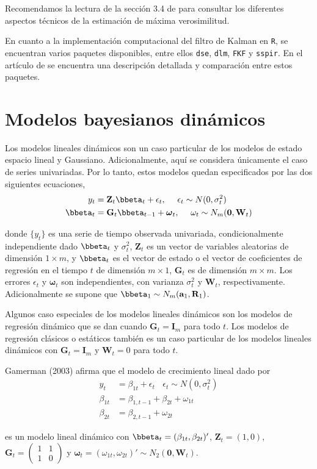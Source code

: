 Recomendamos la lectura de la sección 3.4 de  para consultar los diferentes aspectos técnicos de la estimación de máxima verosimilitud. 

En cuanto a la implementación computacional del filtro de Kalman en \verb'R', se encuentran varios paquetes disponibles, entre ellos \verb'dse', \verb'dlm', \verb'FKF' y \verb'sspir'. En el artículo de  se encuentra una descripción detallada y comparación entre estos paquetes.

\section{Modelos bayesianos dinámicos}

Los modelos lineales dinámicos son un caso particular de los modelos de estado espacio lineal y Gaussiano. Adicionalmente, aquí se considera únicamente el caso de series univariadas. Por lo tanto, estos modelos quedan especificados por las dos siguientes ecuaciones,
\begin{align}
y_t&=\mathbf{Z}_t\bbeta_t+\epsilon_t,\ \ \ \ \epsilon_t\sim N(0,\sigma_t^2)\\
\bbeta_t&=\mathbf{G}_t\bbeta_{t-1}+\boldsymbol{\omega}_t,\ \ \ \ \omega_t\sim N_m(\mathbf{0},\mathbf{W}_t)
\end{align}

donde $\{y_t\}$ es una serie de tiempo observada univariada, condicionalmente independiente dado $\bbeta_t$ y $\sigma^2_t$, $\mathbf{Z}_t$ es un vector de variables aleatorias de dimensión $1\times m$, y $\bbeta_t$ es el vector de estado o el vector de coeficientes de regresión en el tiempo $t$ de dimensión $m\times1$, $\mathbf{G}_t$ es de dimensión $m\times m$. Los errores $\epsilon_t$ y $\boldsymbol{\omega}_t$ son independientes, con varianza $\sigma^2_t$ y $\mathbf{W}_t$, respectivamente. Adicionalmente se supone que $\bbeta_1\sim N_m(\mathbf{a}_1,\mathbf{R}_1)$. 

Algunos caso especiales de los modelos lineales dinámicos son los modelos de regresión dinámico que se dan cuando $\mathbf{G}_t=\mathbf{I}_m$ para todo $t$. Los modelos de regresión clásicos o estáticos también es un caso particular de los modelos lineales dinámicos con $\mathbf{G}_t=\mathbf{I}_m$ y $\mathbf{W}_t=0$ para todo $t$.

\begin{Eje}
Gamerman (2003) afirma que el modelo de crecimiento lineal dado por
\begin{align*}
y_t&=\beta_{1t}+\epsilon_t\ \ \ \ \epsilon_t\sim N(0,\sigma^2_t)\\
\beta_{1t}&=\beta_{1,t-1}+\beta_{2t}+\omega_{1t}\\
\beta_{2t}&=\beta_{2,t-1}+\omega_{2t}
\end{align*}

es un modelo lineal dinámico con $\bbeta_t=(\beta_{1t},\beta_{2t})'$, $\mathbf{Z}_t=(1,0)$, $\mathbf{G}_t=\begin{pmatrix}
1&1\\
1&0
\end{pmatrix}$ y $\boldsymbol{\omega}_t=(\omega_{1t},\omega_{2t})'\sim N_2(\mathbf{0},\mathbf{W}_t)$.
\end{Eje}


